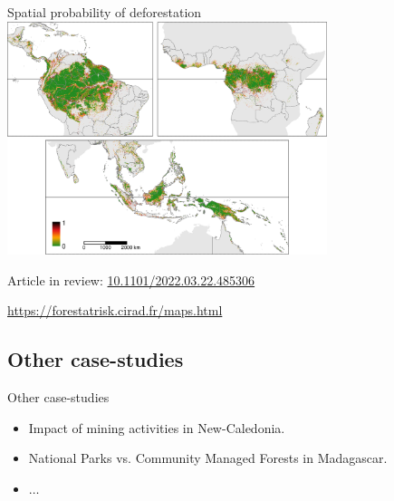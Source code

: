 \documentclass[10pt,table,dvipsnames,compress]{beamer}
\begin{document}
\begin{frame}[label={sec:org3d41cd1}]{Spatial probability of deforestation}
\centering \includegraphics[width=0.7\textwidth]{figs/article/prob}


Article in review: \href{https://doi.org/10.1101/2022.03.22.485306}{10.1101/2022.03.22.485306}

\url{https://forestatrisk.cirad.fr/maps.html}
\end{frame}

\subsection{Other case-studies}
\label{sec:org2349e0d}

\begin{frame}[label={sec:org79f4f75}]{Other case-studies}
\begin{itemize}
\item Impact of mining activities in New-Caledonia.
\item National Parks vs. Community Managed Forests in Madagascar.
\item \(\ldots\)
\end{itemize}
\end{frame}

\end{document}
